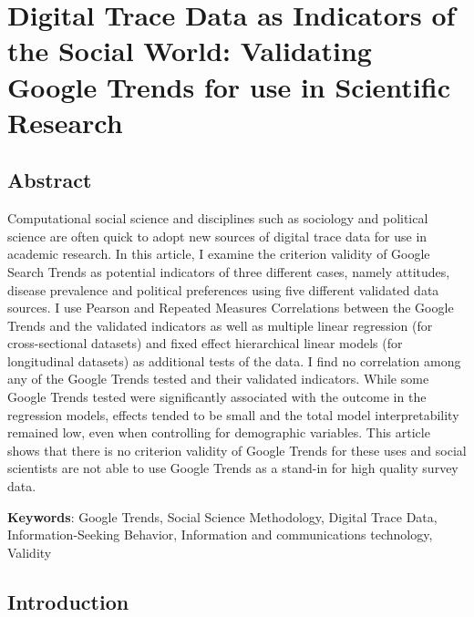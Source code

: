 \hypertarget{paper-1}{%
\chapter{Digital Trace Data as Indicators of the Social World: Validating Google Trends for use in Scientific Research}\label{paper-1}}

\section{Abstract}

Computational social science and disciplines such as sociology and political
science are often quick to adopt new sources of digital trace data for use in
academic research. In this article, I examine the criterion validity of Google
Search Trends as potential indicators of three different cases, namely
attitudes, disease prevalence and political preferences using five different
validated data sources. I use Pearson and Repeated Measures Correlations between
the Google Trends and the validated indicators as well as multiple linear
regression (for cross-sectional datasets) and fixed effect hierarchical linear
models (for longitudinal datasets) as additional tests of the data. I find no
correlation among any of the Google Trends tested and their validated
indicators. While some Google Trends tested were significantly associated with
the outcome in the regression models, effects tended to be small and the total
model interpretability remained low, even when controlling for demographic
variables. This article shows that there is no criterion validity of Google
Trends for these uses and social scientists are not able to use Google Trends as
a stand-in for high quality survey data.

\textbf{Keywords}: Google Trends, Social Science Methodology, Digital Trace Data, Information-Seeking Behavior, Information and communications technology, Validity

\section{Introduction}

